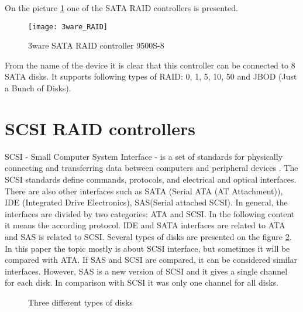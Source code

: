 On the picture \ref{fig:3ware_RAID} one of the SATA RAID controllers is presented. 
\begin{figure}[h]
\begin{center}
  \texttt{[image: 3ware\_RAID]}
\end{center}
  \caption{3ware SATA RAID controller 9500S-8}
  \label{fig:3ware_RAID}
\end{figure}
From the name of the device it is clear that this controller can be connected to 8 SATA disks. It supports following types of RAID: 0, 1, 5, 10, 50 and JBOD (Just a Bunch of Disks).



\section{SCSI RAID controllers}
SCSI - Small Computer System Interface - is a set of standards for physically connecting and transferring data between computers and peripheral devices \cite{book_of_scsi}. The SCSI standards define commands, protocols, and electrical and optical interfaces. There are also other interfaces such as SATA (Serial ATA (AT Attachment)), IDE (Integrated Drive Electronics), SAS(Serial attached SCSI). In general, the interfaces are divided by two categories: ATA and SCSI. In the following content it means the according protocol. IDE and SATA interfaces are related to ATA and SAS is related to SCSI. Several types of disks are presented on the figure \ref{fig:disks}. In this paper the topic mostly is about SCSI interface, but sometimes it will be compared with ATA. If SAS and SCSI are compared, it can be considered similar interfaces. However, SAS is a new version of SCSI and it gives a single channel for each disk. In comparison with SCSI it was only one channel for all disks.
\begin{figure}[h]
  \advance{}\textwidth
  \caption{Three different types of disks}
  \label{fig:disks}
\end{figure}




